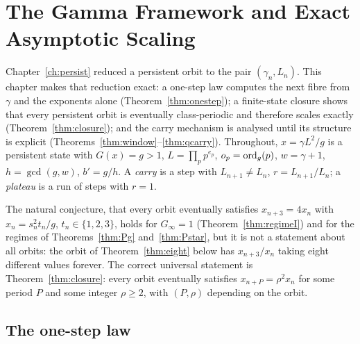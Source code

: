 \chapter{The Gamma Framework and Exact Asymptotic Scaling}\label{ch:gamma}

Chapter~\ref{ch:persist} reduced a persistent orbit to the pair \((\gamma_n,L_n)\). This chapter makes that reduction exact: a one-step law computes the next fibre from \(\gamma\) and the exponents alone (Theorem~\ref{thm:onestep}); a finite-state closure shows that every persistent orbit is eventually class-periodic and therefore scales exactly (Theorem~\ref{thm:closure}); and the carry mechanism is analysed until its structure is explicit (Theorems~\ref{thm:window}--\ref{thm:qcarry}). Throughout, \(x=\gamma L^2/g\) is a persistent state with \(G(x)=g>1\), \(L=\prod_pp^{e_p}\), \(o_p=\operatorname{ord}_g(p)\), \(w=\gamma+1\), \(h=\gcd(g,w)\), \(b'=g/h\). A \emph{carry} is a step with \(L_{n+1}\neq L_n\), \(r=L_{n+1}/L_n\); a \emph{plateau} is a run of steps with \(r=1\).

\begin{remark}\label{rem:T48}
The natural conjecture, that every orbit eventually satisfies \(x_{n+3}=4x_n\) with \(x_n=s_n^2t_n/g\), \(t_n\in\{1,2,3\}\), holds for \(G_\infty=1\) (Theorem~\ref{thm:regimeI}) and for the regimes of Theorems~\ref{thm:Pg} and~\ref{thm:Pstar}, but it is not a statement about all orbits: the orbit of Theorem~\ref{thm:eight} below has \(x_{n+3}/x_n\) taking eight different values forever. The correct universal statement is Theorem~\ref{thm:closure}: every orbit eventually satisfies \(x_{n+P}=\rho^2x_n\) for some period \(P\) and some integer \(\rho\ge2\), with \((P,\rho)\) depending on the orbit.
\end{remark}

\section{The one-step law}

